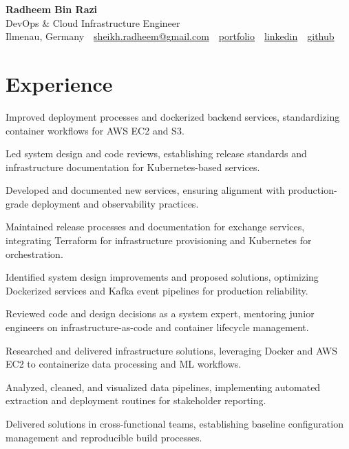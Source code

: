 \documentclass[11pt,a4paper]{resume}
\makeatletter
\newcommand{\Portfolio}{https://radheem.github.io/my-cv}
\newcommand{\PortfolioText}{portfolio}
\newcommand{\GitHub}{https://github.com/radheem}
\newcommand{\LinkedIn}{https://www.linkedin.com/in/radheem-razi}
\newcommand{\Email}{sheikh.radheem@gmail.com}
\makeatother
\begin{document}
\begin{center}
  {\huge\bfseries Radheem Bin Razi}\\[3pt]
  {\large DevOps \& Cloud Infrastructure Engineer}\\[6pt]
  \small
  Ilmenau, Germany \,\textbar\,
  \href{mailto:\Email}{\Email} \,\textbar\,
  \href{\Portfolio}{\PortfolioText} \,\textbar\,
  \href{\LinkedIn}{linkedin} \,\textbar\,
  \href{\GitHub}{github}
\end{center}
\vspace{2pt}

\section{Experience}

\bullets
  \item Improved deployment processes and dockerized backend services, standardizing container workflows for AWS EC2 and S3.
  \item Led system design and code reviews, establishing release standards and infrastructure documentation for Kubernetes-based services.
  \item Developed and documented new services, ensuring alignment with production-grade deployment and observability practices.
\bulletsend
\vspace{3pt}
\bullets
  \item Maintained release processes and documentation for exchange services, integrating Terraform for infrastructure provisioning and Kubernetes for orchestration.
  \item Identified system design improvements and proposed solutions, optimizing Dockerized services and Kafka event pipelines for production reliability.
  \item Reviewed code and design decisions as a system expert, mentoring junior engineers on infrastructure-as-code and container lifecycle management.
\bulletsend
\vspace{3pt}
\bullets
  \item Researched and delivered infrastructure solutions, leveraging Docker and AWS EC2 to containerize data processing and ML workflows.
  \item Analyzed, cleaned, and visualized data pipelines, implementing automated extraction and deployment routines for stakeholder reporting.
  \item Delivered solutions in cross-functional teams, establishing baseline configuration management and reproducible build processes.
\bulletsend
\vspace{3pt}
\end{document}
